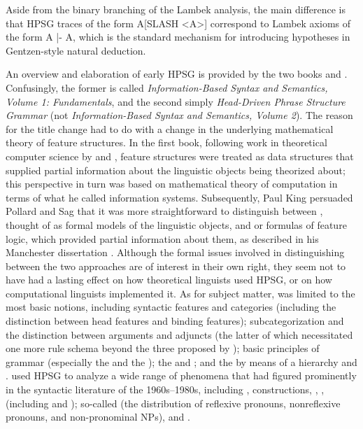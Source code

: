 \documentclass[output=paper]{langsci/langscibook}
\begin{document}
\noindent
Aside from the binary branching of the Lambek analysis, the main difference is that HPSG traces of the form A[SLASH <A>] correspond
to Lambek axioms of the form A |- A, which is the standard mechanism for introducing hypotheses in Gentzen-style natural deduction.

An overview and elaboration of early HPSG is provided by the two books \citet{ps} and \citet{ps2}. Confusingly, the former is called \textit{Information-Based Syntax and Semantics, Volume 1: Fundamentals}, and the second simply \textit{Head-Driven Phrase Structure Grammar} (not \textit{Information-Based Syntax and Semantics, Volume 2}). The reason for the title change had to do with a change in the underlying mathematical theory of feature structures. In the first book, following work in theoretical computer science by \citet{RoundsKasper1986} and \citet{MoshierRounds1987}, feature structures were treated as data structures that supplied partial information about the linguistic objects being theorized about; this perspective in turn was based on  mathematical theory of computation in terms of what he called information systems. Subsequently, Paul King persuaded Pollard and Sag that it was more straightforward to distinguish between , thought of as formal models of the linguistic objects, and  or formulas of feature logic, which provided partial information about them, as described in his Manchester dissertation \citep{King89}.  Although the formal issues involved in distinguishing between the two approaches are of interest in their own right, they seem not to have had a lasting effect on how theoretical linguists used HPSG, or on how computational linguists implemented it. As for subject matter, \citet{ps} was limited to the most basic notions, including syntactic features and categories (including the distinction between head features and binding features); subcategorization and the distinction between arguments and adjuncts (the latter of which necessitated one more rule schema beyond the three proposed by \citet{Pollard85a-u}); basic principles of grammar (especially the  and the ); the  and ; and the  by means of a  hierarchy and . \citet{ps2} used HPSG to analyze a wide range of phenomena that had figured prominently in the syntactic literature of the 1960s--1980s, including ,  constructions, , ,  (including  and ); so-called  (the distribution of reflexive pronouns, nonreflexive pronouns, and non-pronominal NPs), and .
\end{document}

